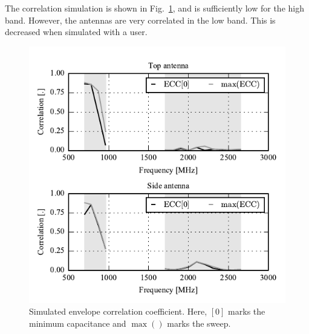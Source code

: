 The correlation simulation is shown in Fig.~\ref{fig:sim_corr}, and is sufficiently low for the high band. However, the antennas are very correlated in the low band. This is decreased when simulated with a user. 
\begin{figure}[tb]
    \centering
    \includegraphics{img/sim/corr/correlation}
    \caption{Simulated envelope correlation coefficient. Here, $[0]$ marks the minimum capacitance and $\max()$ marks the sweep.}
    \label{fig:sim_corr}
\end{figure}


